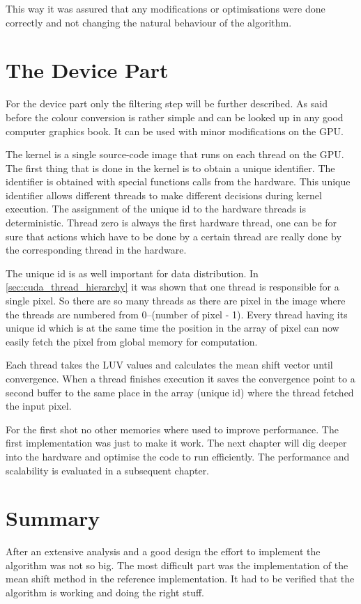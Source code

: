 This way it was assured that any modifications or optimisations were done 
correctly and not changing the natural behaviour of the algorithm. 

\section{The Device Part} %
\label{sec:the_device}
For the device part only the filtering step will be further described. As said
before the colour conversion is rather simple and can be looked up in any good
computer graphics book. It can be used with minor modifications on the \gls{GPU}. 

The kernel is a single source-code image that runs on each thread on the \gls{GPU}.
The first thing that is done in the kernel is to obtain a unique identifier. 
The identifier is obtained with special functions calls from the hardware. This
unique identifier allows different threads to make different decisions during
kernel execution. The assignment of the unique id to the hardware threads is
deterministic. Thread zero is always the first hardware thread, one can be for
sure that actions which have to be done by a certain thread are really done
by the corresponding thread in the hardware. 

The unique id is as well important for data distribution. 
In \autoref{sec:cuda_thread_hierarchy} it was shown that one thread is responsible
for a single pixel. So there are so many threads as there are pixel in the image 
where the threads are numbered from 0--(number of pixel - 1). Every thread having
its unique id which is at the same time the position in the array of pixel can
now easily fetch the pixel from global memory for computation. 

Each thread takes the \gls{LUV} values and calculates the mean shift vector 
until convergence. When a thread finishes execution it saves the convergence 
point to a second buffer to the same place in the array (unique id) where the 
thread fetched the input pixel. 

For the first shot no other memories where used to improve performance. The first
implementation was just to make it work. The next chapter will dig deeper into
the hardware and optimise the code to run efficiently. The performance
and scalability is evaluated in a subsequent chapter. 

\section{Summary} %
\label{sec:summary_implementation}
After an extensive analysis and a good design the effort to implement the algorithm
was not so big. The most difficult part was the implementation of the
mean shift method in the reference implementation. It had to be verified that
the algorithm is working and doing the right stuff. 

